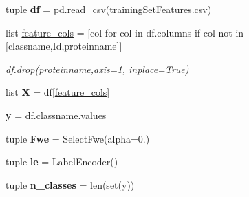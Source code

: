 \begin{DoxyCompactItemize}
\item 
\hypertarget{namespacefeat__extract_1_1plot__roc_adc330f82839e976bce5fb8359c90459f}{}tuple {\bfseries df} = pd.\+read\+\_\+csv(\textquotesingle{}training\+Set\+Features.\+csv\textquotesingle{})\label{namespacefeat__extract_1_1plot__roc_adc330f82839e976bce5fb8359c90459f}

\item 
\hypertarget{namespacefeat__extract_1_1plot__roc_a8b39493420e7e990a45b2b8a41cfd5de}{}list \hyperlink{namespacefeat__extract_1_1plot__roc_a8b39493420e7e990a45b2b8a41cfd5de}{feature\+\_\+cols} = \mbox{[}col for col in df.\+columns if col not in \mbox{[}\textquotesingle{}classname\textquotesingle{},\textquotesingle{}Id\textquotesingle{},\textquotesingle{}proteinname\textquotesingle{}\mbox{]}\mbox{]}\label{namespacefeat__extract_1_1plot__roc_a8b39493420e7e990a45b2b8a41cfd5de}

\begin{DoxyCompactList}\small\item\em df.\+drop(\textquotesingle{}proteinname\textquotesingle{},axis=1, inplace=True) \end{DoxyCompactList}\item 
\hypertarget{namespacefeat__extract_1_1plot__roc_aec9c4df013fc88a78c3302fa393d59b6}{}list {\bfseries X} = df\mbox{[}\hyperlink{namespacefeat__extract_1_1plot__roc_a8b39493420e7e990a45b2b8a41cfd5de}{feature\+\_\+cols}\mbox{]}\label{namespacefeat__extract_1_1plot__roc_aec9c4df013fc88a78c3302fa393d59b6}

\item 
\hypertarget{namespacefeat__extract_1_1plot__roc_a0d1f7e80452338d1ad67e7f9e2b0809f}{}{\bfseries y} = df.\+classname.\+values\label{namespacefeat__extract_1_1plot__roc_a0d1f7e80452338d1ad67e7f9e2b0809f}

\item 
\hypertarget{namespacefeat__extract_1_1plot__roc_a14fc4605fdda1fa3729d6dadafed6d43}{}tuple {\bfseries Fwe} = Select\+Fwe(alpha=0.)\label{namespacefeat__extract_1_1plot__roc_a14fc4605fdda1fa3729d6dadafed6d43}

\item 
\hypertarget{namespacefeat__extract_1_1plot__roc_aa979a076424b35fed2f996a6c531672f}{}tuple {\bfseries le} = Label\+Encoder()\label{namespacefeat__extract_1_1plot__roc_aa979a076424b35fed2f996a6c531672f}

\item 
\hypertarget{namespacefeat__extract_1_1plot__roc_a591378c32ba05b68140db2ffa0d8e814}{}tuple {\bfseries n\+\_\+classes} = len(set(y))\label{namespacefeat__extract_1_1plot__roc_a591378c32ba05b68140db2ffa0d8e814}


\end{DoxyCompactItemize}
